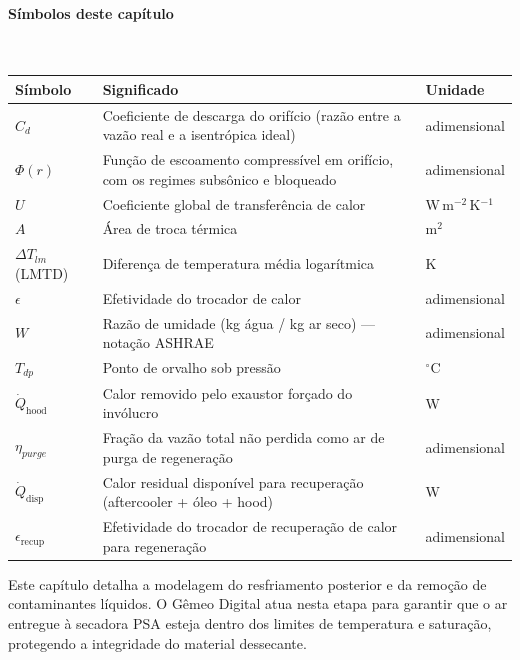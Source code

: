 \documentclass[12pt,a4paper]{article}
\numberwithin{equation}{section}
\numberwithin{table}{section}
\numberwithin{figure}{section}
\begin{document}
\paragraph{Símbolos deste capítulo}\mbox{}\\[-0.5em]
{\small
\begin{longtable}{>{\raggedright\arraybackslash}p{2.6cm} >{\raggedright\arraybackslash}p{9.2cm} >{\raggedright\arraybackslash}p{2.6cm}}
	\toprule
	\textbf{Símbolo} & \textbf{Significado} & \textbf{Unidade} \\ \midrule
	\endhead
	$C_d$ & Coeficiente de descarga do orifício (razão entre a vazão real e a isentrópica ideal) & adimensional \\
	$\Phi(r)$ & Função de escoamento compressível em orifício, com os regimes subsônico e bloqueado & adimensional \\
	$U$ & Coeficiente global de transferência de calor & W\,m$^{-2}$\,K$^{-1}$ \\
	$A$ & Área de troca térmica & m$^2$ \\
	$\Delta T_{lm}$ (LMTD) & Diferença de temperatura média logarítmica & K \\
	$\epsilon$ & Efetividade do trocador de calor & adimensional \\
	$W$\dag & Razão de umidade (kg água / kg ar seco) — notação ASHRAE & adimensional \\
	$T_{dp}$ & Ponto de orvalho sob pressão & $^{\circ}$C \\
	$\dot{Q}_{\text{hood}}$ & Calor removido pelo exaustor forçado do invólucro & W \\
	$\eta_{purge}$ & Fração da vazão total não perdida como ar de purga de regeneração & adimensional \\
	$\dot{Q}_{\text{disp}}$ & Calor residual disponível para recuperação (aftercooler + óleo + hood) & W \\
	$\epsilon_{\text{recup}}$ & Efetividade do trocador de recuperação de calor para regeneração & adimensional \\
	\bottomrule
\end{longtable}
}





	
	Este capítulo detalha a modelagem do resfriamento posterior e da remoção de contaminantes líquidos. O Gêmeo Digital atua nesta etapa para garantir que o ar entregue à secadora PSA esteja dentro dos limites de temperatura e saturação, protegendo a integridade do material dessecante.
	
\end{document}
